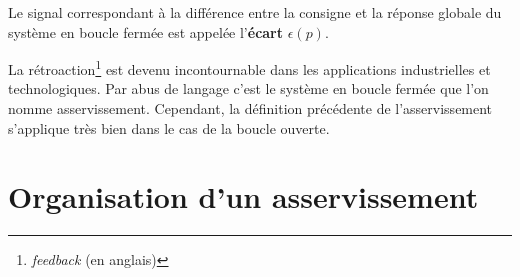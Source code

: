 \begin{itemize}
%                                      
%                                      
%
\begin{center}
\end{center}
          Le signal correspondant à la différence entre la consigne
          et la réponse globale du système en boucle fermée est
          appelée l'\textbf{écart} $\epsilon(p)$.
\end{itemize}

La rétroaction\footnote{\emph{feedback} (en anglais)} est
devenu incontournable dans les applications industrielles                                                                     
et technologiques.
Par abus de langage c'est le système en boucle fermée
que l'on nomme asservissement. Cependant, la 
définition précédente de l'asservissement s'applique très bien dans 
le cas de la boucle ouverte.

\clearpage
\section{Organisation d'un asservissement}

